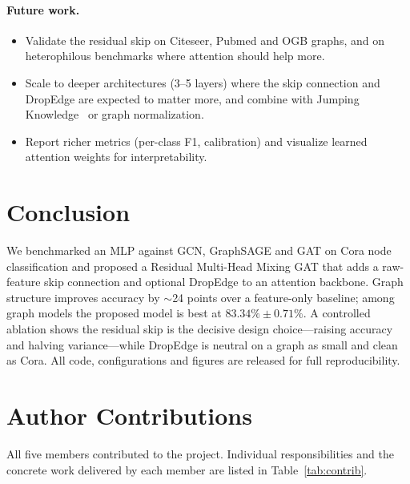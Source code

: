 \documentclass{article}
\begin{document}
\paragraph{Future work.}
\begin{itemize}
  \item Validate the residual skip on Citeseer, Pubmed and OGB graphs, and on
        heterophilous benchmarks where attention should help more.
  \item Scale to deeper architectures (3--5 layers) where the skip connection and
        DropEdge are expected to matter more, and combine with Jumping
        Knowledge~\cite{xu2018jknet} or graph normalization.
  \item Report richer metrics (per-class F1, calibration) and visualize learned
        attention weights for interpretability.
\end{itemize}

\section{Conclusion}
\label{sec:conclusion}

We benchmarked an MLP against GCN, GraphSAGE and GAT on Cora node classification and
proposed a Residual Multi-Head Mixing GAT that adds a raw-feature skip connection and
optional DropEdge to an attention backbone. Graph structure improves accuracy by
$\sim$24 points over a feature-only baseline; among graph models the proposed model is
best at $83.34\% \pm 0.71\%$. A controlled ablation shows the residual skip is the
decisive design choice---raising accuracy and halving variance---while DropEdge is
neutral on a graph as small and clean as Cora. All code, configurations and figures
are released for full reproducibility.

\section*{Author Contributions}
All five members contributed to the project. Individual responsibilities and the
concrete work delivered by each member are listed in Table~\ref{tab:contrib}.
\end{document}

